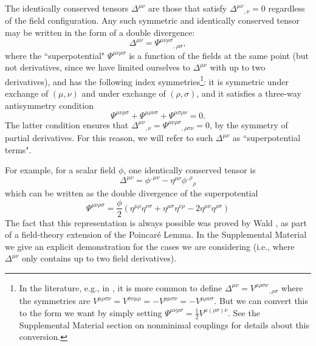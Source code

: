 \documentclass[aps,physrev,preprint,groupedaddress]{revtex4-2}
\begin{document}
The identically conserved tensors \(\Delta^{\mu\nu}\) are those that satisfy \(\Delta^{\mu\nu}{}_{,\nu}=0\)
regardless of the field configuration. Any such symmetric and identically conserved tensor may be written in the form of a double divergence:
\begin{equation}\Delta^{\mu\nu}=\Psi^{\mu\nu\rho\sigma}{}_{,\rho\sigma},\end{equation}
where the ``superpotential" \(\Psi^{\mu\nu\rho\sigma}\) is a function of the fields at the same point (but not derivatives, since we have limited ourselves to \(\Delta^{\mu\nu}\) with up to two derivatives), and has the following index symmetries\footnote{In the literature, e.g., in \cite{Wald90}, it is more common to define \(\Delta^{\mu\nu}=V^{\mu\rho\sigma\nu}{}_{,\rho\sigma}\) where the symmetries are \(V^{\mu\rho\sigma\nu}=V^{\sigma\nu\mu\rho}=-V^{\rho\mu\sigma\nu}=-V^{\mu\rho\nu\sigma}\). But we can convert this to the form we want by simply setting \(\Psi^{\mu\nu\rho\sigma}=\frac{1}{2}V^{\mu(\rho\sigma)\nu}\). See the Supplemental Material section on nonminimal couplings for details about this conversion.}: it is symmetric under exchange of \((\mu,\nu)\) and under exchange of \((\rho,\sigma)\), and it satisfies a three-way antisymmetry condition
\begin{equation}\label{3antiPsi}
     \Psi^{\mu\nu\rho\sigma}+ \Psi^{\mu\rho\nu\sigma}+ \Psi^{\mu\sigma\rho\nu}=0.
\end{equation}
The latter condition ensures that \(\Delta^{\mu\nu}{}_{,\nu}=\Psi^{\mu\nu\rho\sigma}{}_{,\rho\sigma\nu}=0\), by the symmetry of partial derivatives. For this reason, we will refer to such \(\Delta^{\mu\nu}\) as ``superpotential terms". 

For example, for a scalar field \(\phi\), one identically conserved tensor is 
\begin{equation}
    \Delta^{\mu\nu}=\phi^{,\mu\nu}-\eta^{\mu\nu}\phi^{,\rho}{}_\rho
\end{equation}
which can be written as the double divergence of the superpotential
\begin{equation}
    \Psi^{\mu\nu\rho\sigma}=\frac{\phi}{2}\left(\eta^{\mu\rho}\eta^{\nu\sigma}+\eta^{\mu\sigma}\eta^{\nu\rho}-2\eta^{\mu\nu}\eta^{\rho\sigma}\right)
\end{equation}
The fact that this representation is always possible was proved by Wald \cite{Wald90}, as part of a field-theory extension of the Poincar\'e Lemma. In the Supplemental Material we give an explicit demonstration for the cases we are considering (i.e., where \(\Delta^{\mu\nu}\) only contains up to two field derivatives).
\end{document}
